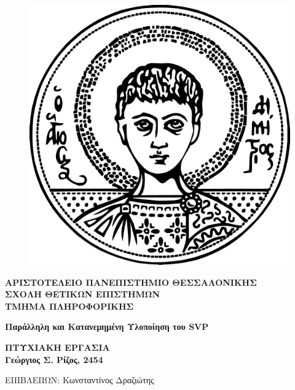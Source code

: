 \begin{figure}[h] %
\vspace*{-1cm}
\centering
\includegraphics[scale=0.35]{pictures/AUThLogo.png}
\end{figure}

\begin{center}
 { \large \bf ΑΡΙΣΤΟΤΕΛΕΙΟ ΠΑΝΕΠΙΣΤΗΜΙΟ ΘΕΣΣΑΛΟΝΙΚΗΣ
  \\ ΣΧΟΛΗ ΘΕΤΙΚΩΝ ΕΠΙΣΤΗΜΩΝ 
   \\ΤΜΗΜΑ ΠΛΗΡΟΦΟΡΙΚΗΣ
    \\}
\vspace{2cm}

{\large \bf Παράλληλη και Κατανεμημένη Υλοποίηση του \lt SVP}
    
\vspace{2.5cm}

{\large \bf ΠΤΥΧΙΑΚΗ ΕΡΓΑΣΙΑ
\\ Γεώργιος Σ. Ρίζος, 2454
  \\}
  
  \vspace{2cm}
  
  {ΕΠΙΒΛΕΠΩΝ: Κωνσταντίνος Δραζιώτης}
\end{center}

